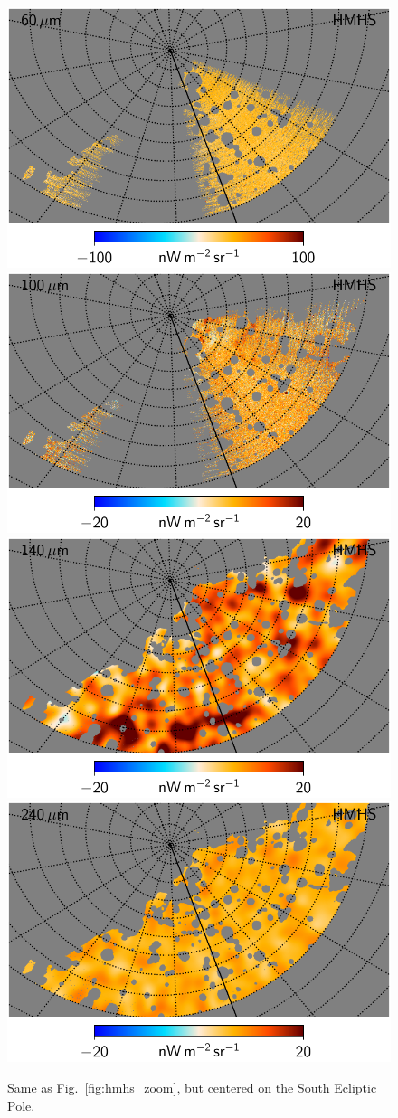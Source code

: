 \documentclass{aa}
\begin{document}
\begin{figure}
  \includegraphics[width=0.376\linewidth]{figs/CGDR2_07_hmhs_fullres_v4_south.pdf}\hspace*{5mm}
  \includegraphics[width=0.376\linewidth]{figs/CGDR2_08_hmhs_fullres_v4_south.pdf}\\
  \includegraphics[width=0.376\linewidth]{figs/CGDR2_09_hmhs_fullres_3deg_v4_south.pdf}\hspace*{5mm}
  \includegraphics[width=0.376\linewidth]{figs/CGDR2_10_hmhs_fullres_3deg_v4_south.pdf}
  \caption{Same as Fig.~\ref{fig:hmhs_zoom}, but centered on the South Ecliptic Pole.}
  \label{fig:hmhs_zoom_south}
\end{figure}
\end{document}
